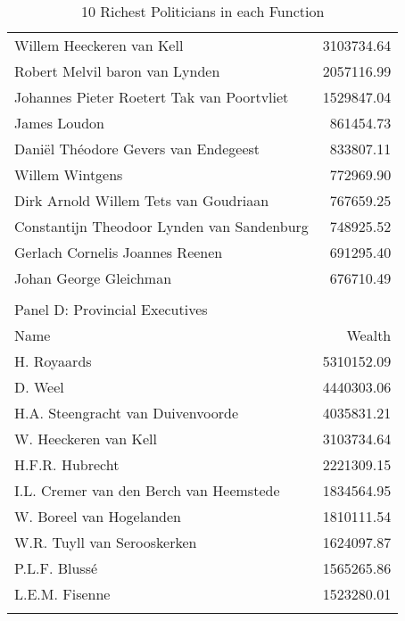 \begin{table}[ht]
\begin{tabular}{lr}
Willem Heeckeren van Kell & 3103734.64 \\ 
  Robert Melvil baron van Lynden & 2057116.99 \\ 
  Johannes Pieter Roetert Tak van Poortvliet & 1529847.04 \\ 
  James Loudon & 861454.73 \\ 
  Daniël Théodore Gevers van Endegeest & 833807.11 \\ 
  Willem Wintgens & 772969.90 \\ 
  Dirk Arnold Willem Tets van Goudriaan & 767659.25 \\ 
  Constantijn Theodoor Lynden van Sandenburg & 748925.52 \\ 
  Gerlach Cornelis Joannes Reenen & 691295.40 \\ 
  Johan George Gleichman & 676710.49 \\ 
   \hline\\ 
\multicolumn{2}{l}{Panel D: Provincial Executives}\\ 
\hline
Name & Wealth \\\hline
H. Royaards & 5310152.09 \\ 
  D. Weel & 4440303.06 \\ 
  H.A. Steengracht van Duivenvoorde & 4035831.21 \\ 
  W. Heeckeren van Kell & 3103734.64 \\ 
  H.F.R. Hubrecht & 2221309.15 \\ 
  I.L. Cremer van den Berch van Heemstede & 1834564.95 \\ 
  W. Boreel van Hogelanden & 1810111.54 \\ 
  W.R. Tuyll van Serooskerken & 1624097.87 \\ 
  P.L.F. Blussé & 1565265.86 \\ 
  L.E.M. Fisenne & 1523280.01 \\ 
   \hline
\multicolumn{2}{l}{}\\
\end{tabular}
\endgroup
\caption{10 Richest Politicians in each Function} 
\label{tab:richestpols}
\end{table}
